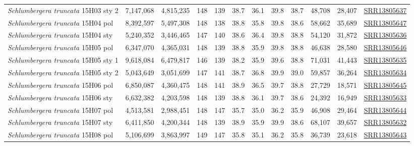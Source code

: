 \documentclass[fleqn,10pt,lineno]{wlpeerj}
\begin{document}
\begin{table}[ht]
{\begin{tabular}{l|cc|cc|cc|cc|cc|c}
\textit{Schlumbergera truncata} 15H03 sty 2 & 7,147,068 & 4,815,235 & 148 & 139 & 38.7 & 36.1 & 39.8 & 38.7 & 48,708 & 28,407 & \href{https://trace.ncbi.nlm.nih.gov/Traces/sra/?run=SRR13805637}{SRR13805637} \\
\textit{Schlumbergera truncata} 15H04 pol   & 8,392,597 & 5,497,308 & 148 & 138 & 38.8 & 35.8 & 39.8 & 38.6 & 58,662 & 35,689 & \href{https://trace.ncbi.nlm.nih.gov/Traces/sra/?run=SRR13805647}{SRR13805647} \\
\textit{Schlumbergera truncata} 15H04 sty   & 5,240,352 & 3,446,465 & 147 & 140 & 38.6 & 36.4 & 39.8 & 38.8 & 54,120 & 31,872 & \href{https://trace.ncbi.nlm.nih.gov/Traces/sra/?run=SRR13805636}{SRR13805636} \\
\textit{Schlumbergera truncata} 15H05 pol   & 6,347,070 & 4,365,031 & 148 & 139 & 38.8 & 35.9 & 39.8 & 38.8 & 46,638 & 28,580 & \href{https://trace.ncbi.nlm.nih.gov/Traces/sra/?run=SRR13805646}{SRR13805646} \\
\textit{Schlumbergera truncata} 15H05 sty 1 & 9,618,084 & 6,479,817 & 146 & 139 & 38.2 & 35.9 & 39.6 & 38.8 & 71,031 & 41,443 & \href{https://trace.ncbi.nlm.nih.gov/Traces/sra/?run=SRR13805635}{SRR13805635} \\
\textit{Schlumbergera truncata} 15H05 sty 2 & 5,043,649 & 3,051,699 & 147 & 141 & 38.7 & 36.8 & 39.9 & 39.0 & 59,857 & 36,264 & \href{https://trace.ncbi.nlm.nih.gov/Traces/sra/?run=SRR13805634}{SRR13805634} \\
\textit{Schlumbergera truncata} 15H06 pol   & 6,850,087 & 4,360,475 & 148 & 141 & 38.9 & 36.5 & 39.7 & 38.8 & 27,729 & 18,571 & \href{https://trace.ncbi.nlm.nih.gov/Traces/sra/?run=SRR13805645}{SRR13805645} \\
\textit{Schlumbergera truncata} 15H06 sty   & 6,632,382 & 4,203,598 & 148 & 139 & 38.8 & 36.1 & 39.7 & 38.6 & 24,392 & 16,949 & \href{https://trace.ncbi.nlm.nih.gov/Traces/sra/?run=SRR13805633}{SRR13805633} \\
\textit{Schlumbergera truncata} 15H07 pol   & 4,513,581 & 2,988,451 & 148 & 147 & 35.7 & 35.0 & 36.2 & 35.9 & 46,908 & 29,464 & \href{https://trace.ncbi.nlm.nih.gov/Traces/sra/?run=SRR13805644}{SRR13805644} \\
\textit{Schlumbergera truncata} 15H07 sty   & 6,411,850 & 4,200,344 & 148 & 139 & 38.9 & 35.9 & 39.9 & 38.6 & 68,107 & 39,657 & \href{https://trace.ncbi.nlm.nih.gov/Traces/sra/?run=SRR13805632}{SRR13805632} \\
\textit{Schlumbergera truncata} 15H08 pol   & 5,106,699 & 3,863,997 & 149 & 147 & 35.8 & 35.1 & 36.2 & 35.8 & 36,739 & 23,618 & \href{https://trace.ncbi.nlm.nih.gov/Traces/sra/?run=SRR13805643}{SRR13805643} \\

\end{tabular}}
\end{table}
\end{document}
